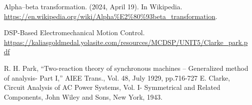 Alpha–beta transformation. (2024, April 19). In Wikipedia. \url{https://en.wikipedia.org/wiki/Alpha%E2%80%93beta_transformation}.

DSP-Based Electromechanical Motion Control. \url{httpas://kaliasgoldmedal.yolasite.com/resources/MCDSP/UNIT5/Clarke_park.pdf}

R. H. Park, “Two-reaction theory of synchronous machines – Generalized method of analysis- Part I,” AIEE Trans., Vol. 48, July 1929, pp.716-727
E. Clarke, Circuit Analysis of AC Power Systems, Vol. I- Symmetrical and Related Components, John Wiley and Sons, New York, 1943.

